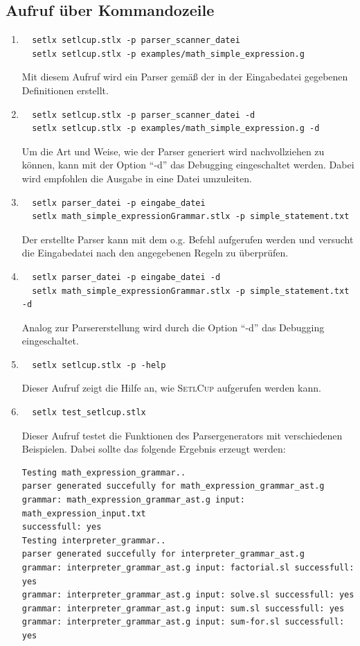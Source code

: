 \subsection{Aufruf über Kommandozeile}
\begin{enumerate}
	\item \begin{Verbatim}
  setlx setlcup.stlx -p parser_scanner_datei
  setlx setlcup.stlx -p examples/math_simple_expression.g
	\end{Verbatim}
			Mit diesem Aufruf wird ein Parser gemäß der in der Eingabedatei gegebenen Definitionen erstellt.
	\item \begin{Verbatim}
  setlx setlcup.stlx -p parser_scanner_datei -d
  setlx setlcup.stlx -p examples/math_simple_expression.g -d
	\end{Verbatim}
			Um die Art und Weise, wie der Parser generiert wird nachvollziehen zu können, kann mit der Option "`-d"' das Debugging eingeschaltet werden. Dabei wird empfohlen die Ausgabe in eine Datei umzuleiten.
	\item \begin{Verbatim}
  setlx parser_datei -p eingabe_datei
  setlx math_simple_expressionGrammar.stlx -p simple_statement.txt
	\end{Verbatim}
	Der erstellte Parser kann mit dem o.g. Befehl aufgerufen werden und versucht die Eingabedatei nach den angegebenen Regeln zu überprüfen.
		\item \begin{Verbatim}
  setlx parser_datei -p eingabe_datei -d
  setlx math_simple_expressionGrammar.stlx -p simple_statement.txt -d
	\end{Verbatim}
	Analog zur Parsererstellung wird durch die Option "`-d"' das Debugging eingeschaltet.
	\item \begin{Verbatim}
  setlx setlcup.stlx -p -help
	\end{Verbatim}
			Dieser Aufruf zeigt die Hilfe an, wie \textsc{SetlCup} aufgerufen werden kann.
	\item \begin{Verbatim}
  setlx test_setlcup.stlx
	\end{Verbatim}
			Dieser Aufruf testet die Funktionen des Parsergenerators mit verschiedenen Beispielen. Dabei sollte das folgende Ergebnis erzeugt werden:
\begin{flushleft}
\begin{Verbatim}
Testing math_expression_grammar..
parser generated succefully for math_expression_grammar_ast.g
grammar: math_expression_grammar_ast.g input: math_expression_input.txt 
successfull: yes
Testing interpreter_grammar..
parser generated succefully for interpreter_grammar_ast.g
grammar: interpreter_grammar_ast.g input: factorial.sl successfull: yes
grammar: interpreter_grammar_ast.g input: solve.sl successfull: yes
grammar: interpreter_grammar_ast.g input: sum.sl successfull: yes
grammar: interpreter_grammar_ast.g input: sum-for.sl successfull: yes
\end{Verbatim}
\end{flushleft}
\end{enumerate}
